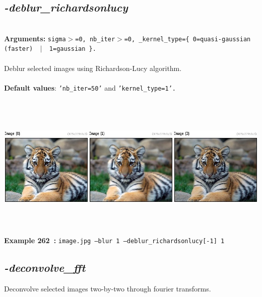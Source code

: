 \documentclass[a4paper,11pt,twoside]{book}
\begin{document}
\subsection{\emph{-deblur\_richardsonlucy} }\vspace*{-0.5em}
~\\\textbf{Arguments: } 
{\small \texttt{sigma$>$=0, nb\_iter$>$=0, \_kernel\_type=\{ 0=quasi-gaussian (faster) ~$|$~ 1=gaussian \}.}}\\~\\
Deblur selected images using Richardson-Lucy algorithm.
~\\~\\\textbf{Default values}: {\small \texttt{'nb\_iter=50'} and \texttt{'kernel\_type=1'.}}
\begin{center}\includegraphics[keepaspectratio=true,height=7cm,width=\textwidth]{img/gmic_def262.jpg}\\
{\footnotesize \textbf{Example 262~:} \texttt{image.jpg --blur 1 --deblur\_richardsonlucy[-1] 1}}
\end{center}

\subsection{\emph{-deconvolve\_fft} }\vspace*{-0.5em}
Deconvolve selected images two-by-two through fourier transforms.
\end{document}
